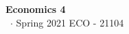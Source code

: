 \documentclass[8pt,a4paper]{extarticle}
\renewcommand{\csClass}{Economics 4}
\renewcommand{\csClassCode}{ECO - 21104}
\renewcommand{\csTerm}{Spring 2021}
\begin{document}
\begin{titlepage}
    \begin{center}
	\vspace*{1cm}
	\Huge
        \textbf{\csClass}
	\vspace{0.5cm} \\
	\Large
        \cs\ $\cdot$ \csTerm
        \vfill
        \csAuthorName
	\vspace{0.8cm}
        \csClassCode\\
        \csSchool     
    \end{center}
\end{titlepage}

\begin{multicols}{3}
\setcounter{page}{1}

\vfill\eject
\columnbreak
\end{multicols}
\end{document}
